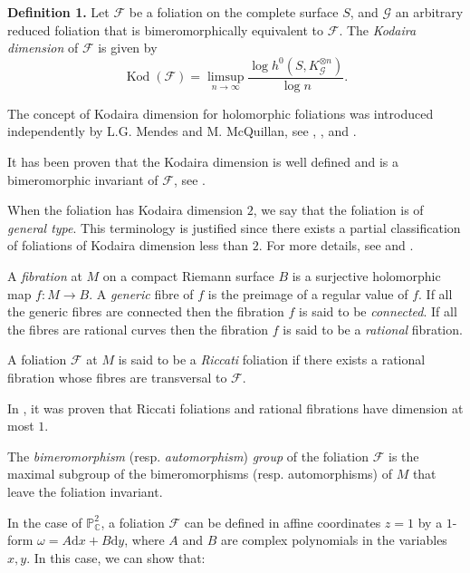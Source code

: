 \documentclass[british]{article}
\newenvironment{rmenv}[1]
  {\phantomsection\par\smallskip\noindent\textbf{#1.}\rmfamily}
  {\par\smallskip}
\newcommand{\oldpage}[1]{\marginpar{\footnotesize$\Big\vert$ \textit{p.~#1}}}
\begin{document}
\oldpage{50}

\protect{}\label{definition-1}
\begin{rmenv}{Definition 1}
Let \({\mathcal{F}}\) be a foliation on the complete surface \(S\), and
\({\mathcal{G}}\) an arbitrary reduced foliation that is
bimeromorphically equivalent to \({\mathcal{F}}\). The \emph{Kodaira
dimension} of \({\mathcal{F}}\) is given by \[
  \operatorname{Kod}({\mathcal{F}})
  = \limsup_{n\to\infty} \frac{\log h^0(S,K_{\mathcal{G}}^{\otimes n})}{\log n}.
\]

\end{rmenv}

The concept of Kodaira dimension for holomorphic foliations was
introduced independently by L.G. Mendes and M. McQuillan, see
\autocite{2}, \autocite{12}, and \autocite{11}.

It has been proven that the Kodaira dimension is well defined and is a
bimeromorphic invariant of \({\mathcal{F}}\), see \autocite{12}.

When the foliation has Kodaira dimension \(2\), we say that the
foliation is of \emph{general type}. This terminology is justified since
there exists a partial classification of foliations of Kodaira dimension
less than \(2\). For more details, see \autocite{11} and \autocite{2}.

A \emph{fibration} at \(M\) on a compact Riemann surface \(B\) is a
surjective holomorphic map \(f\colon M\to B\). A \emph{generic} fibre of
\(f\) is the preimage of a regular value of \(f\). If all the generic
fibres are connected then the fibration \(f\) is said to be
\emph{connected}. If all the fibres are rational curves then the
fibration \(f\) is said to be a \emph{rational} fibration.

A foliation \({\mathcal{F}}\) at \(M\) is said to be a \emph{Riccati}
foliation if there exists a rational fibration whose fibres are
transversal to \({\mathcal{F}}\).

In \autocite{12}, it was proven that Riccati foliations and rational
fibrations have dimension at most \(1\).

The \emph{bimeromorphism} (resp. \emph{automorphism}) \emph{group} of
the foliation \({\mathcal{F}}\) is the maximal subgroup of the
bimeromorphisms (resp. automorphisms) of \(M\) that leave the foliation
invariant.

In the case of \(\mathbb{P}_\mathbb{C}^2\), a foliation
\({\mathcal{F}}\) can be defined in affine coordinates \(z=1\) by a
\(1\)-form \(\omega=A\mathrm{d}{x}+B\mathrm{d}{y}\), where \(A\) and
\(B\) are complex polynomials in the variables \(x,y\). In this case, we
can show that:
\end{document}
